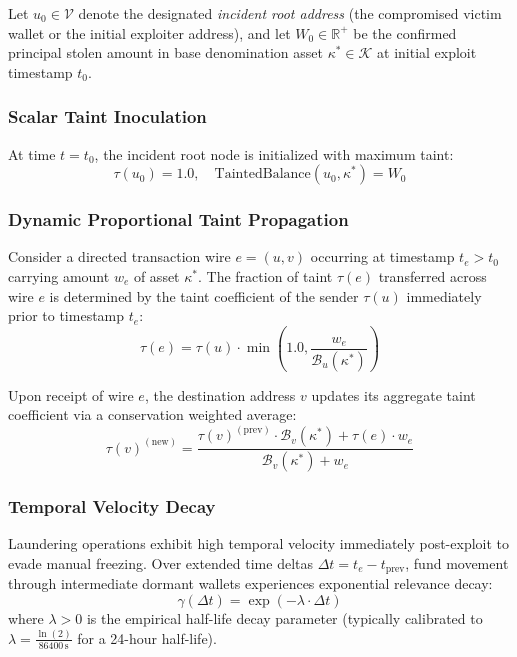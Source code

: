 Let $u_0 \in \mathcal{V}$ denote the designated \emph{incident root address} (the compromised victim wallet or the initial exploiter address), and let $W_0 \in \mathbb{R}^+$ be the confirmed principal stolen amount in base denomination asset $\kappa^* \in \mathcal{K}$ at initial exploit timestamp $t_0$.

\subsubsection{Scalar Taint Inoculation}
At time $t = t_0$, the incident root node is initialized with maximum taint:
\begin{equation}
    \tau(u_0) = 1.0, \quad \text{TaintedBalance}(u_0, \kappa^*) = W_0
\end{equation}

\subsubsection{Dynamic Proportional Taint Propagation}
Consider a directed transaction wire $e = (u, v)$ occurring at timestamp $t_e > t_0$ carrying amount $w_e$ of asset $\kappa^*$. The fraction of taint $\tau(e)$ transferred across wire $e$ is determined by the taint coefficient of the sender $\tau(u)$ immediately prior to timestamp $t_e$:
\begin{equation}
    \tau(e) = \tau(u) \cdot \min\left(1.0, \frac{w_e}{\mathcal{B}_u(\kappa^*)}\right)
\end{equation}

Upon receipt of wire $e$, the destination address $v$ updates its aggregate taint coefficient via a conservation weighted average:
\begin{equation}
    \tau(v)^{(\text{new})} = \frac{\tau(v)^{(\text{prev})} \cdot \mathcal{B}_v(\kappa^*) + \tau(e) \cdot w_e}{\mathcal{B}_v(\kappa^*) + w_e}
    \label{eq:taint_update}
\end{equation}

\subsubsection{Temporal Velocity Decay}
Laundering operations exhibit high temporal velocity immediately post-exploit to evade manual freezing. Over extended time deltas $\Delta t = t_e - t_{\text{prev}}$, fund movement through intermediate dormant wallets experiences exponential relevance decay:
\begin{equation}
    \gamma(\Delta t) = \exp(-\lambda \cdot \Delta t)
\end{equation}
where $\lambda > 0$ is the empirical half-life decay parameter (typically calibrated to $\lambda = \frac{\ln(2)}{86400\,\text{s}}$ for a 24-hour half-life).

